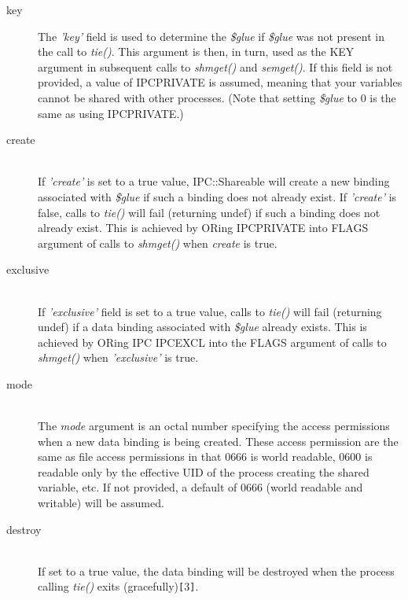 \begin{description}

\item[key]%
%

The {\em 'key'\/} field is used to determine the {\em \$glue\/} if {\em \$glue\/} was
not present in the call to {\em tie()\/}.  This argument is then, in turn,
used as the KEY argument in subsequent calls to {\em shmget()\/} and {\em semget()\/}.
If this field is not provided, a value of IPC\underscore{}PRIVATE is assumed,
meaning that your variables cannot be shared with other
processes. (Note that setting {\em \$glue\/} to 0 is the same as using
IPC\underscore{}PRIVATE.)

\item[create]%
%
\hfil\\
If {\em 'create'\/} is set to a true value, IPC::Shareable will create a new
binding associated with {\em \$glue\/} if such a binding does not already
exist.  If {\em 'create'\/} is false, calls to {\em tie()\/} will fail (returning
undef) if such a binding does not already exist.  This is achieved by
ORing IPC\underscore{}PRIVATE into FLAGS argument of calls to {\em shmget()\/} when
{\em create\/} is true.

\item[exclusive]%
%
\hfil\\
If {\em 'exclusive'\/} field is set to a true value, calls to {\em tie()\/} will
fail (returning undef) if a data binding associated with {\em \$glue\/}
already exists.  This is achieved by ORing IPC\underscore{} IPC\underscore{}EXCL into the
FLAGS argument of calls to {\em shmget()\/} when {\em 'exclusive'\/} is true.

\item[mode]%
%
\hfil\\
The {\em mode\/} argument is an octal number specifying the access
permissions when a new data binding is being created.  These access
permission are the same as file access permissions in that 0666 is
world readable, 0600 is readable only by the effective UID of the
process creating the shared variable, etc.  If not provided, a default
of 0666 (world readable and writable) will be assumed.

\item[destroy]%
%
\hfil\\
If set to a true value, the data binding will be destroyed when the
process calling {\em tie()\/} exits (gracefully){\tt [}3{\tt ]}.

\end{description}

